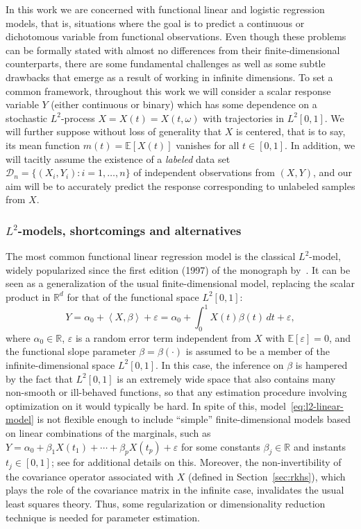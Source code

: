 \documentclass[ba]{imsart}
\numberwithin{equation}{section}
\theoremstyle{plain}
\renewcommand{\epsilon}{\varepsilon}
\newcommand{\R}{\mathbb{R}}
\newcommand{\E}{\mathbb{E}}
\newcommand\dotprod[2]{\left\langle #1, #2 \right\rangle}
\begin{document}
In this work we are concerned with functional linear and logistic regression models, that is, situations where the goal is to predict a continuous or dichotomous variable from functional observations. Even though these problems can be formally stated with almost no differences from their finite-dimensional counterparts, there are some fundamental challenges as well as some subtle drawbacks that emerge as a result of working in infinite dimensions. To set a common framework, throughout this work we will consider a scalar response variable \(Y\) (either continuous or binary) which has some dependence on a stochastic \(L^2\)-process \(X=X(t)=X(t, \omega)\) with trajectories in \(L^2[0, 1]\). We will further suppose without loss of generality that \(X\) is centered, that is to say, its mean function \(m(t)=\E[X(t)]\) vanishes for all \(t\in[0,1]\). In addition, we will tacitly assume the existence of a \textit{labeled} data set \(\mathcal D_n =\{(X_i, Y_i): i=1,\dots, n\}\) of independent observations from \((X, Y)\), and our aim will be to accurately predict the response corresponding to unlabeled samples from \(X\).

\subsubsection{\(L^2\)-models, shortcomings and alternatives}

 The most common functional linear regression model is the classical \(L^2\)-model, widely popularized since the first edition (1997) of the monograph by~\citet{ramsay2005functional}. It can be seen as a generalization of the usual finite-dimensional model, replacing the scalar product in \(\R^d\) for that of the functional space \(L^2[0,1]\):
\begin{equation}\label{eq:l2-linear-model}
Y = \alpha_0 + \dotprod{X}{\beta} + \epsilon = \alpha_0 + \int_0^1 X(t)\beta(t)\, dt + \epsilon,
\end{equation}
where \(\alpha_0\in \R\), \(\epsilon\) is a random error term independent from \(X\) with \(\E [\epsilon]=0\), and the functional slope parameter \(\beta=\beta(\cdot)\) is assumed to be a member of the infinite-dimensional space \(L^2[0, 1]\). In this case, the inference on \(\beta\) is hampered by the fact that \(L^2[0,1]\) is an extremely wide space that also contains many non-smooth or ill-behaved functions, so that any estimation procedure involving optimization on it would typically be hard. In spite of this, model~\eqref{eq:l2-linear-model} is not flexible enough to include ``simple'' finite-dimensional models based on linear combinations of the marginals, such as \(Y=\alpha_0 + \beta_1 X(t_1)+ \cdots + \beta_p X(t_p) + \epsilon\) for some constants \(\beta_j\in\R\) and instants \(t_j\in[0,1]\); see \citet{berrendero2020general} for additional details on this. Moreover, the non-invertibility of the covariance operator associated with \(X\) (defined in Section~\ref{sec:rkhs}), which plays the role of the covariance matrix in the infinite case, invalidates the usual least squares theory. Thus, some regularization or dimensionality reduction technique is needed for parameter estimation.
\end{document}
